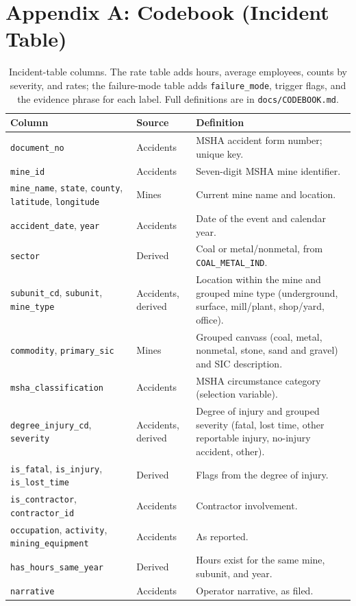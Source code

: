 \documentclass[letterpaper,twocolumn,10pt]{article}
\begin{document}
\clearpage
\onecolumn
\section*{Appendix A: Codebook (Incident Table)}
\begin{table}[H]
\small
\begin{tabularx}{\textwidth}{@{}llL@{}}
\toprule
\textbf{Column} & \textbf{Source} & \textbf{Definition} \\
\midrule
\texttt{document\_no} & Accidents & MSHA accident form number; unique key. \\
\texttt{mine\_id} & Accidents & Seven-digit MSHA mine identifier. \\
\texttt{mine\_name}, \texttt{state}, \texttt{county}, \texttt{latitude}, \texttt{longitude} & Mines & Current mine name and location. \\
\texttt{accident\_date}, \texttt{year} & Accidents & Date of the event and calendar year. \\
\texttt{sector} & Derived & Coal or metal/nonmetal, from \texttt{COAL\_METAL\_IND}. \\
\texttt{subunit\_cd}, \texttt{subunit}, \texttt{mine\_type} & Accidents, derived & Location within the mine and grouped mine type (underground, surface, mill/plant, shop/yard, office). \\
\texttt{commodity}, \texttt{primary\_sic} & Mines & Grouped canvass (coal, metal, nonmetal, stone, sand and gravel) and SIC description. \\
\texttt{msha\_classification} & Accidents & MSHA circumstance category (selection variable). \\
\texttt{degree\_injury\_cd}, \texttt{severity} & Accidents, derived & Degree of injury and grouped severity (fatal, lost time, other reportable injury, no-injury accident, other). \\
\texttt{is\_fatal}, \texttt{is\_injury}, \texttt{is\_lost\_time} & Derived & Flags from the degree of injury. \\
\texttt{is\_contractor}, \texttt{contractor\_id} & Accidents & Contractor involvement. \\
\texttt{occupation}, \texttt{activity}, \texttt{mining\_equipment} & Accidents & As reported. \\
\texttt{has\_hours\_same\_year} & Derived & Hours exist for the same mine, subunit, and year. \\
\texttt{narrative} & Accidents & Operator narrative, as filed. \\
\bottomrule
\end{tabularx}
\caption{Incident-table columns. The rate table adds hours, average employees, counts by severity, and rates; the failure-mode table adds \texttt{failure\_mode}, trigger flags, and the evidence phrase for each label. Full definitions are in \texttt{docs/CODEBOOK.md}.}
\end{table}
\end{document}
